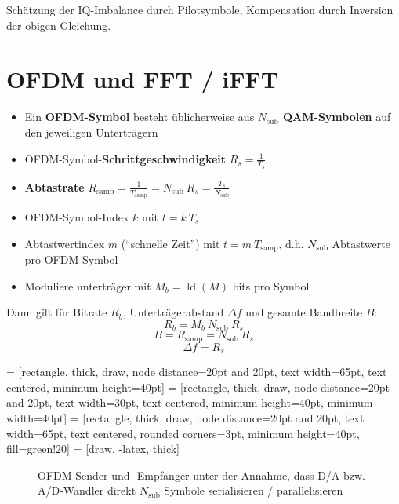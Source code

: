 \documentclass[a4paper, 11pt]{article}
\DeclareMathOperator{\ld}{ld}
\begin{document}
Schätzung der IQ-Imbalance durch Pilotsymbole, Kompensation durch Inversion der obigen Gleichung.

\section*{OFDM und FFT / iFFT}
\begin{itemize}
\item Ein \textbf{OFDM-Symbol} besteht üblicherweise aus \textbf{$N_{\mathrm{sub}}$ QAM-Symbolen} auf den jeweiligen Unterträgern
\item OFDM-Symbol-\textbf{Schrittgeschwindigkeit} $R_s = \frac{1}{T_s}$
\item \textbf{Abtastrate} $R_{\mathrm{samp}} = \frac{1}{T_{\mathrm{samp}}} = N_{\mathrm{sub}} ~ R_s = \frac{T_s}{N_{\mathrm{sub}}}$
\item OFDM-Symbol-Index $k$ mit $t = k ~ T_s$
\item Abtastwertindex $m$ (``schnelle Zeit'') mit $t = m ~ T_{\mathrm{samp}}$, d.h. $N_{\mathrm{sub}}$ Abtastwerte pro OFDM-Symbol
\item Moduliere unterträger mit $M_b = \ld(M)$ bits pro Symbol
\end{itemize}


Dann gilt für Bitrate $R_b$, Unterträgerabstand $\Delta f$ und gesamte Bandbreite $B$:
\[
	R_b = M_b ~ N_{\mathrm{sub}} ~ R_s
\]
\[
	B = R_{\mathrm{samp}} = N_{\mathrm{sub}} ~ R_s
\]
\[
	\Delta f = R_s
\]

 = [rectangle, thick, draw, node distance=20pt and 20pt, text width=65pt, text centered, minimum height=40pt]
 = [rectangle, thick, draw, node distance=20pt and 20pt, text width=30pt, text centered, minimum height=40pt, minimum width=40pt]
 = [rectangle, thick, draw, node distance=20pt and 20pt, text width=65pt, text centered, rounded corners=3pt, minimum height=40pt, fill=green!20]
 = [draw, -latex, thick]

\begin{figure}[H]
	\centering
	\caption*{OFDM-Sender und -Empfänger unter der Annahme, dass D/A bzw. A/D-Wandler direkt $N_{\mathrm{sub}}$ Symbole serialisieren / parallelisieren}
\end{figure}
\end{document}
